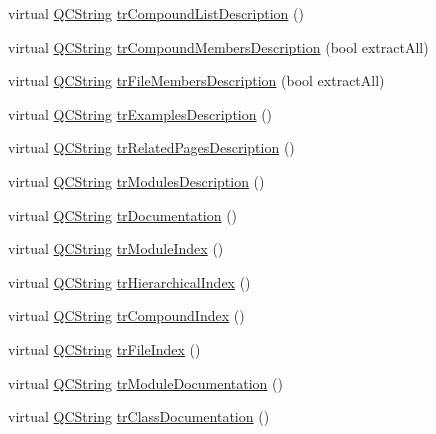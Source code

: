 \begin{DoxyCompactItemize}
\item 
virtual \hyperlink{class_q_c_string}{Q\-C\-String} \hyperlink{class_translator_slovak_af008bc8cb43ee14946b1671d80099a34}{tr\-Compound\-List\-Description} ()
\item 
virtual \hyperlink{class_q_c_string}{Q\-C\-String} \hyperlink{class_translator_slovak_ab5fb09f47fa021d41e036d9f41bf741a}{tr\-Compound\-Members\-Description} (bool extract\-All)
\item 
virtual \hyperlink{class_q_c_string}{Q\-C\-String} \hyperlink{class_translator_slovak_a209311e74b83f8ac8eba8581d8a89eb9}{tr\-File\-Members\-Description} (bool extract\-All)
\item 
virtual \hyperlink{class_q_c_string}{Q\-C\-String} \hyperlink{class_translator_slovak_a0085d1262f19b68fdad2ad542f24914e}{tr\-Examples\-Description} ()
\item 
virtual \hyperlink{class_q_c_string}{Q\-C\-String} \hyperlink{class_translator_slovak_a9343c5fac5dbcf77ba7c31a80cb74846}{tr\-Related\-Pages\-Description} ()
\item 
virtual \hyperlink{class_q_c_string}{Q\-C\-String} \hyperlink{class_translator_slovak_aafdd368977a57dc31d200e624a1358ac}{tr\-Modules\-Description} ()
\item 
virtual \hyperlink{class_q_c_string}{Q\-C\-String} \hyperlink{class_translator_slovak_abde5870e18c641cdd9104c08a5cb42e7}{tr\-Documentation} ()
\item 
virtual \hyperlink{class_q_c_string}{Q\-C\-String} \hyperlink{class_translator_slovak_ac13cd71aaccdf563fb4b51179c6c3254}{tr\-Module\-Index} ()
\item 
virtual \hyperlink{class_q_c_string}{Q\-C\-String} \hyperlink{class_translator_slovak_af0fb797c11c9aaa2f584997c3b19efb6}{tr\-Hierarchical\-Index} ()
\item 
virtual \hyperlink{class_q_c_string}{Q\-C\-String} \hyperlink{class_translator_slovak_a0d67faac0c6d3dec493e01e0076a3425}{tr\-Compound\-Index} ()
\item 
virtual \hyperlink{class_q_c_string}{Q\-C\-String} \hyperlink{class_translator_slovak_ad31a22beb2f300011b5d84c896efed48}{tr\-File\-Index} ()
\item 
virtual \hyperlink{class_q_c_string}{Q\-C\-String} \hyperlink{class_translator_slovak_a2f997aa177e7016c7ab42e3a04677bbd}{tr\-Module\-Documentation} ()
\item 
virtual \hyperlink{class_q_c_string}{Q\-C\-String} \hyperlink{class_translator_slovak_ad110ea7837f16d330713712fbc45f3ef}{tr\-Class\-Documentation} ()
\item 

\end{DoxyCompactItemize}
